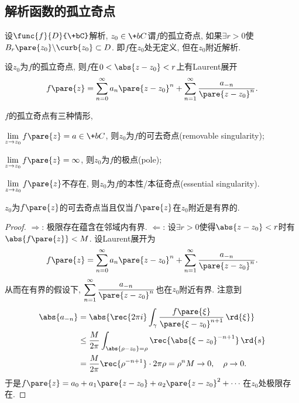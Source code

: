 \documentclass{ctexart}
\begin{document}
\subsection{解析函数的孤立奇点} %
\label{sub:解析函数的孤立奇点}

\begin{definition}
    设$\func{f}{D}{\+bC}$解析, $z_0\in \+bC$谓$f$的孤立奇点, 如果$\exists r>0$使$B_r\pare{z_0}\backslash \curb{z_0}\subset D$. 即$f$在$z_0$处无定义, 但在$z_0$附近解析.
\end{definition}
设$z_0$为$f$的孤立奇点, 则$f$在$0 < \abs{z-z_0} < r$上有Laurent展开
\[ f\pare{z} = \sum_{n=0}^\infty a_n \pare{z-z_0}^n + \sum_{n=1}^\infty \frac{a_{-n}}{\pare{z-z_0}^n}. \]
\begin{definition}
    $f$的孤立奇点有三种情形,
    \begin{cenum}
        \item $\displaystyle \lim_{z\rightarrow z_0}f\pare{z} = a\in \+bC$, 则$z_0$为$f$的可去奇点(removable singularity);
        \item $\displaystyle \lim_{z\rightarrow z_0}f\pare{z} = \infty$, 则$z_0$为$f$的极点(pole);
        \item $\displaystyle \lim_{z\rightarrow z_0}f\pare{z}$不存在, 则$z_0$为$f$的本性/本征奇点(essential singularity).
    \end{cenum}
\end{definition}
\begin{theorem}[Riemann]
    $z_0$为$f\pare{z}$的可去奇点当且仅当$f\pare{z}$在$z_0$附近是有界的.
\end{theorem}
\begin{proof}
    $\Rightarrow$: 极限存在蕴含在邻域内有界. $\Leftarrow$: 设$\exists r>0$使得$\abs{z-z_0}<r$时有$\abs{f\pare{z}}<M$. 设Laurent展开为
    \[ f\pare{z} = \sum_{n=0}^\infty a_n \pare{z-z_0}^n + \sum_{n=1}^\infty \frac{a_{-n}}{\pare{z-z_0}^{n}}. \]
    从而在有界的假设下, $\displaystyle \sum_{n=1}^\infty \frac{a_{-n}}{\pare{z-z_0}^{n}}$也在$z_0$附近有界. 注意到
    \begin{align*}
        \abs{a_{-n}} &= \abs{\rec{2\pi i} \int_\gamma \frac{f\pare{\xi}}{\pare{\xi-z_0}^{n+1}}\,\rd{\xi}} \\
        &\le \frac{M}{2\pi} \int_{\abs{\rho - z_0}=\rho} \rec{\abs{\xi - z_0}^{-n+1}}\,\rd{s} \\
        &= \frac{M}{2\pi} \rec{\rho^{-n+1}}\cdot 2\pi \rho = \rho^nM \rightarrow 0,\quad \rho\rightarrow 0.
    \end{align*}
    于是$\displaystyle f\pare{z} = a_0 + a_1\pare{z-z_0} + a_2\pare{z-z_0}^2 + \cdots$在$z_0$处极限存在.
\end{proof}
\end{document}

